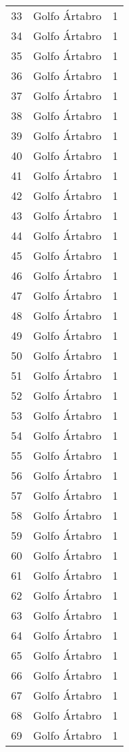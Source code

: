 \begin{table}[p]
\begin{tabular}{rlr}
  33 & Golfo Ártabro &   1 \\ 
  34 & Golfo Ártabro &   1 \\ 
  35 & Golfo Ártabro &   1 \\ 
  36 & Golfo Ártabro &   1 \\ 
  37 & Golfo Ártabro &   1 \\ 
  38 & Golfo Ártabro &   1 \\ 
  39 & Golfo Ártabro &   1 \\ 
  40 & Golfo Ártabro &   1 \\ 
  41 & Golfo Ártabro &   1 \\ 
  42 & Golfo Ártabro &   1 \\ 
  43 & Golfo Ártabro &   1 \\ 
  44 & Golfo Ártabro &   1 \\ 
  45 & Golfo Ártabro &   1 \\ 
  46 & Golfo Ártabro &   1 \\ 
  47 & Golfo Ártabro &   1 \\ 
  48 & Golfo Ártabro &   1 \\ 
  49 & Golfo Ártabro &   1 \\ 
  50 & Golfo Ártabro &   1 \\ 
  51 & Golfo Ártabro &   1 \\ 
  52 & Golfo Ártabro &   1 \\ 
  53 & Golfo Ártabro &   1 \\ 
  54 & Golfo Ártabro &   1 \\ 
  55 & Golfo Ártabro &   1 \\ 
  56 & Golfo Ártabro &   1 \\ 
  57 & Golfo Ártabro &   1 \\ 
  58 & Golfo Ártabro &   1 \\ 
  59 & Golfo Ártabro &   1 \\ 
  60 & Golfo Ártabro &   1 \\ 
  61 & Golfo Ártabro &   1 \\ 
  62 & Golfo Ártabro &   1 \\ 
  63 & Golfo Ártabro &   1 \\ 
  64 & Golfo Ártabro &   1 \\ 
  65 & Golfo Ártabro &   1 \\ 
  66 & Golfo Ártabro &   1 \\ 
  67 & Golfo Ártabro &   1 \\ 
  68 & Golfo Ártabro &   1 \\ 
  69 & Golfo Ártabro &   1 \\ 

\end{tabular}
\end{table}
